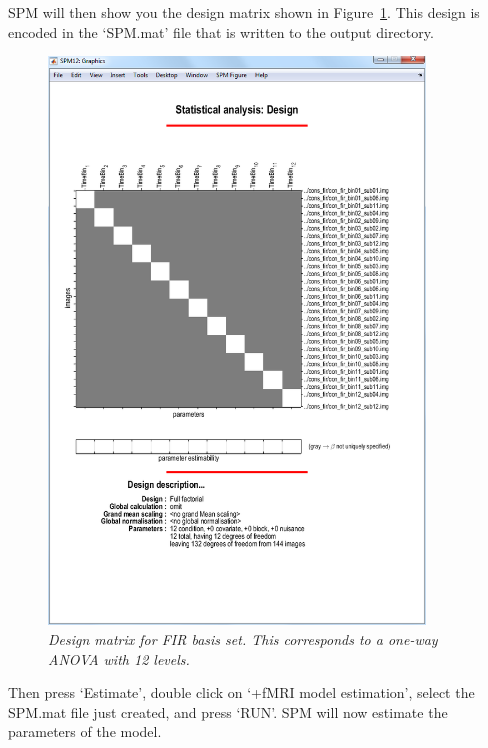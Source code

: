SPM will then show you the design matrix shown in Figure~\ref{fir_design}. This design is encoded in the `SPM.mat' file that is written to the output directory.
\begin{figure}
\begin{center}
\includegraphics[width=100mm]{faces_group/fir_design}
\caption{\em Design matrix for FIR basis set. This corresponds to a one-way ANOVA with 12 levels. \label{fir_design}}
\end{center}
\end{figure}
Then press `Estimate', double click on `+fMRI model   estimation', select the SPM.mat file just created, and press `RUN'.
SPM will now estimate the parameters of the model.

